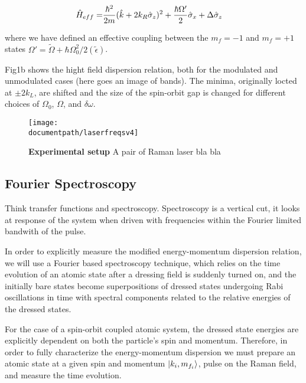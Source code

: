 \begin{align}
	\begin{split}
		\hat{H}_{eff} = & \frac{\hbar^2}{2m}(\hat{k}+2{{k_R}}\hat{\sigma}_z)^2 + \frac{\hbar\Omega'}{2}\hat{\sigma}_x  +\Delta\hat{\sigma}_z  
	\label{Eq:SOChalf}
	\end{split}
\end{align}	
 
where we have defined an effective coupling between the $m_f=-1$ and $m_f=+1$ states $\Omega'=\tilde{\Omega}+\hbar\Omega_0^2/2(\tilde{\epsilon})$. 


Fig1b shows the hight field dispersion relation, both for the modulated and unmodulated cases (here goes an image of bands). The minima, originally locted at $\pm2 k_L$, are shifted and the size of the spin-orbit gap is changed for different choices of $\Omega_0$, $\Omega$, and $\delta\omega$.  

\begin{figure}
	\begin{center}
		\texttt{[image: \\documentpath/laserfreqsv4]}
		\caption{{\bf Experimental setup}
		A pair of Raman laser bla bla}
		\label{Fig:Setup}
	\end{center}
\end{figure}




\subsection{Fourier Spectroscopy}		


Think transfer functions and spectroscopy. Spectroscopy is a vertical cut, it looks at response of the system when driven with frequencies within the Fourier limited bandwith of the pulse. 


In order to explicitly measure the modified energy-momentum dispersion relation, we will use a Fourier based spectroscopy technique, which relies on the time evolution of an atomic state after a dressing field is suddenly turned on, and the initially bare states become superpositions of dressed states undergoing Rabi oscillations in time  with spectral components related to the relative energies of the dressed states. 



For the case of a spin-orbit coupled atomic system, the dressed state energies are explicitly dependent on both the particle's spin and momentum. Therefore, in order to fully characterize the energy-momentum dispersion we must prepare an atomic state at a given spin and momentum $|k_i,m_{f_i}\rangle$, pulse on the Raman field, and measure the time evolution.  

